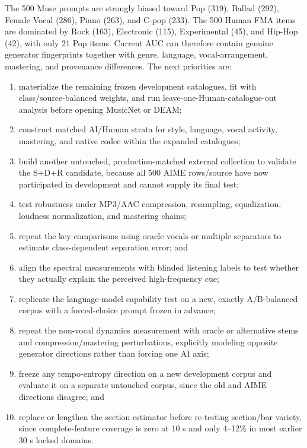 \documentclass[11pt,a4paper]{article}
\begin{document}
The 500 Muse prompts are strongly biased toward Pop (319), Ballad (292), Female Vocal (286), Piano (263), and C-pop (233). The 500 Human FMA items are dominated by Rock (163), Electronic (115), Experimental (45), and Hip-Hop (42), with only 21 Pop items. Current AUC can therefore contain genuine generator fingerprints together with genre, language, vocal-arrangement, mastering, and provenance differences. The next priorities are:

\begin{enumerate}
  \item materialize the remaining frozen development catalogues, fit with class/source-balanced weights, and run leave-one-Human-catalogue-out analysis before opening MusicNet or DEAM;
  \item construct matched AI/Human strata for style, language, vocal activity, mastering, and native codec within the expanded catalogues;
  \item build another untouched, production-matched external collection to validate the S+D+R candidate, because all 500 AIME rows/source have now participated in development and cannot supply its final test;
  \item test robustness under MP3/AAC compression, resampling, equalization, loudness normalization, and mastering chains;
  \item repeat the key comparisons using oracle vocals or multiple separators to estimate class-dependent separation error; and
  \item align the spectral measurements with blinded listening labels to test whether they actually explain the perceived high-frequency cue;
  \item replicate the language-model capability test on a new, exactly A/B-balanced corpus with a forced-choice prompt frozen in advance;
  \item repeat the non-vocal dynamics measurement with oracle or alternative stems and compression/mastering perturbations, explicitly modeling opposite generator directions rather than forcing one AI axis;
  \item freeze any tempo-entropy direction on a new development corpus and evaluate it on a separate untouched corpus, since the old and AIME directions disagree; and
  \item replace or lengthen the section estimator before re-testing section/bar variety, since complete-feature coverage is zero at 10 s and only 4--12\% in most earlier 30 s locked domains.
\end{enumerate}
\end{document}
